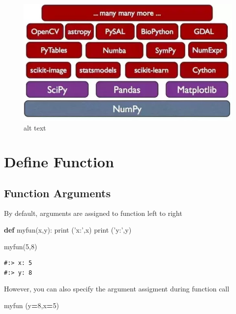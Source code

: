 \documentclass[
]{book}
\newenvironment{Shaded}{\begin{snugshade}}{\end{snugshade}}
\newcommand{\BuiltInTok}[1]{#1}
\newcommand{\DecValTok}[1]{\textcolor[rgb]{0.06,0.06,0.06}{#1}}
\newcommand{\KeywordTok}[1]{\textcolor[rgb]{0.27,0.27,0.27}{\textbf{#1}}}
\newcommand{\NormalTok}[1]{#1}
\newcommand{\OperatorTok}[1]{\textcolor[rgb]{0.43,0.43,0.43}{\textbf{#1}}}
\newcommand{\StringTok}[1]{\textcolor[rgb]{0.5,0.5,0.5}{#1}}
\begin{document}
\begin{figure}
\centering
\includegraphics{img/ml_libraries.jpg}
\caption{alt text}
\end{figure}

\hypertarget{define-function}{%
\section{Define Function}\label{define-function}}

\hypertarget{function-arguments}{%
\subsection{Function Arguments}\label{function-arguments}}

By default, arguments are assigned to function left to right

\begin{Shaded}
\begin{Highlighting}[]
\KeywordTok{def}\NormalTok{ myfun(x,y):}
    \BuiltInTok{print}\NormalTok{ (}\StringTok{'x:'}\NormalTok{,x)}
    \BuiltInTok{print}\NormalTok{ (}\StringTok{'y:'}\NormalTok{,y)}
    
\NormalTok{myfun(}\DecValTok{5}\NormalTok{,}\DecValTok{8}\NormalTok{)}
\end{Highlighting}
\end{Shaded}

\begin{verbatim}
#:> x: 5
#:> y: 8
\end{verbatim}

However, you can also specify the argument assigment during function call

\begin{Shaded}
\begin{Highlighting}[]
\NormalTok{myfun (y}\OperatorTok{=}\DecValTok{8}\NormalTok{,x}\OperatorTok{=}\DecValTok{5}\NormalTok{)}
\end{Highlighting}
\end{Shaded}
\end{document}
